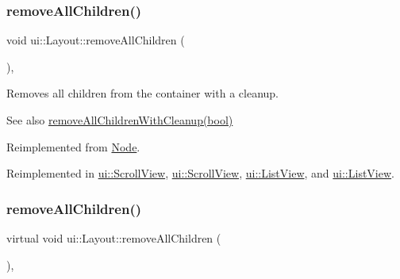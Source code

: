 \subsubsection{\texorpdfstring{remove\+All\+Children()}{removeAllChildren()}\hspace{0.1cm}{\footnotesize\ttfamily [1/2]}}
{\footnotesize\ttfamily void ui\+::\+Layout\+::remove\+All\+Children (\begin{DoxyParamCaption}{ }\end{DoxyParamCaption})\hspace{0.3cm}{\ttfamily [override]}, {\ttfamily [virtual]}}

Removes all children from the container with a cleanup.

\begin{DoxySeeAlso}{See also}
{\ttfamily \hyperlink{classui_1_1Layout_a7c317fa2fc294158776962b9218304b9}{remove\+All\+Children\+With\+Cleanup(bool)}} 
\end{DoxySeeAlso}


Reimplemented from \hyperlink{classNode_a0f6ef5518d2e5dd5be405e98b37ace4a}{Node}.



Reimplemented in \hyperlink{classui_1_1ScrollView_aa036ed1712c78c6ee701eb94eea55091}{ui\+::\+Scroll\+View}, \hyperlink{classui_1_1ScrollView_aaef2d3ce7b1b7d485af4a3657bea17e5}{ui\+::\+Scroll\+View}, \hyperlink{classui_1_1ListView_acfa88e95692c1e9713697fbd2754379b}{ui\+::\+List\+View}, and \hyperlink{classui_1_1ListView_a7e534825fe60406ed544a254b0975489}{ui\+::\+List\+View}.

\mbox{\label{classui_1_1Layout_ace8bad280eb1b1df51211cca73131530}} 
\subsubsection{\texorpdfstring{remove\+All\+Children()}{removeAllChildren()}\hspace{0.1cm}{\footnotesize\ttfamily [2/2]}}
{\footnotesize\ttfamily virtual void ui\+::\+Layout\+::remove\+All\+Children (\begin{DoxyParamCaption}{ }\end{DoxyParamCaption})\hspace{0.3cm}{\ttfamily [override]}, {\ttfamily [virtual]}}

